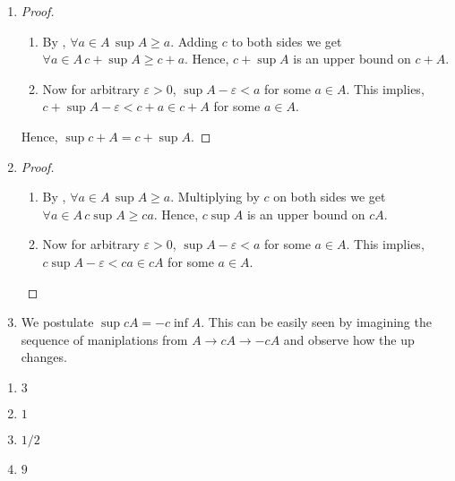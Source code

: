 \begin{enumerate}[label=(\alph*)]
    \item 
    \begin{proof}
        \begin{enumerate}[label=(\roman*)]
            \item 
            By , $\forall a \in A \, \sup A \geq a$. 
            Adding $c$ to both sides we get $\forall a \in A \, c + \sup A \geq c + a $. Hence, $c + \sup{A}$ is an upper bound on $c+A$.

            \item 
            Now for arbitrary $\varepsilon > 0$, $\sup A - \varepsilon < a$ for some $a \in A$. This implies, $c + \sup A - \varepsilon < c + a \in c + A$ for some $a \in A$.
        \end{enumerate}
        Hence, $\sup{c+A} = c + \sup A$.
    \end{proof}

    \item
    \begin{proof}
        \begin{enumerate}[label=(\roman*)]
            \item 
            By , $\forall a \in A \, \sup A \geq a$. 
            Multiplying by $c$ on both sides we get $\forall a \in A \, c \sup A \geq c a $. Hence, $c \sup{A}$ is an upper bound on $c A$.

            \item 
            Now for arbitrary $\varepsilon > 0$, $\sup A - \varepsilon < a$ for some $a \in A$. This implies, $c \sup A - \varepsilon < c a \in c A$ for some $a \in A$.

        \end{enumerate}
    \end{proof}

    \item 
    We postulate $\sup{cA} = -c \inf A$. This can be easily seen by imagining the sequence of maniplations from $A \rightarrow cA \rightarrow -cA$ and 
    observe how the up changes.
\end{enumerate}

\begin{enumerate}[label=(\alph*)]
    \item $3$
    \item $1$
    \item $1/2$
    \item $9$
\end{enumerate}

